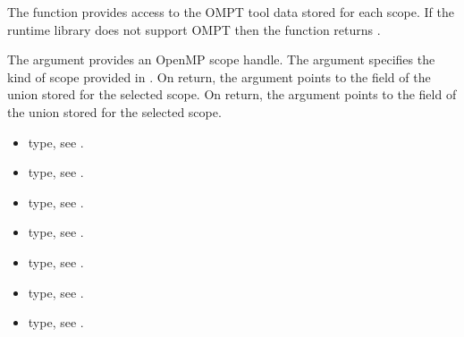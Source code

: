 \descr
The  function provides access to the OMPT tool data
stored for each scope. If the runtime library does not support OMPT then the 
function returns .

\argdesc
The  argument provides an OpenMP scope handle. The  
argument specifies the kind of scope provided in . On return, 
the  argument points to the  field of the  
union stored for the selected scope. On return, the  argument points to 
the   field of the  union stored for the selected scope.

\crossreferences
\begin{itemize}
\item {} type, see .

\item {} type, 
see .

\item {} type, 
see .

\item {} type, 
see .

\item {} type, see .

\item {} type, see .

\item {} type, see .
\end{itemize}

